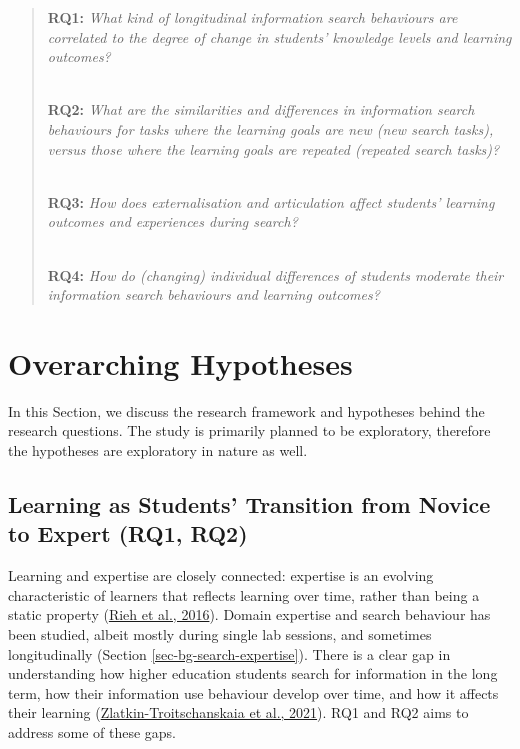 \documentclass[letterpaper, nobind]{templates/ociamthesis}
\begin{document}
\begin{quote}
\textbf{RQ1:} \emph{What kind of longitudinal information search behaviours are correlated to the degree of change in students' knowledge levels and learning outcomes?}\\
\strut \\
\textbf{RQ2:} \emph{What are the similarities and differences in information search behaviours for tasks where the learning goals are new (new search tasks), versus those where the learning goals are repeated (repeated search tasks)?}\\
\strut \\
\textbf{RQ3:} \emph{How does externalisation and articulation affect students' learning outcomes and experiences during search?}\\
\strut \\
\textbf{RQ4:} \emph{How do (changing) individual differences of students moderate their information search behaviours and learning outcomes?}
\end{quote}

\hypertarget{sec-rq-hypotheses}{%
\section{Overarching Hypotheses}\label{sec-rq-hypotheses}}

In this Section, we discuss the research framework and hypotheses behind
the research questions. The study is primarily planned to be
exploratory, therefore the hypotheses are exploratory in nature as well.

\hypertarget{sec-framework-rq1-rq2}{%
\subsection{Learning as Students' Transition from Novice to Expert (RQ1, RQ2)}\label{sec-framework-rq1-rq2}}

Learning and expertise are closely connected: expertise is an evolving
characteristic of learners that reflects learning over time, rather than
being a static property (\protect\hyperlink{ref-rieh2016searching}{Rieh et al., 2016}). Domain expertise and
search behaviour has been studied, albeit mostly during single lab
sessions, and sometimes longitudinally (Section \ref{sec-bg-search-expertise}). There is a clear gap in
understanding how higher education students search for information in
the long term, how their information use behaviour develop over time,
and how it affects their learning (\protect\hyperlink{ref-zlatkin2021students}{Zlatkin-Troitschanskaia et al., 2021}). RQ1 and RQ2
aims to address some of these gaps.
\end{document}
